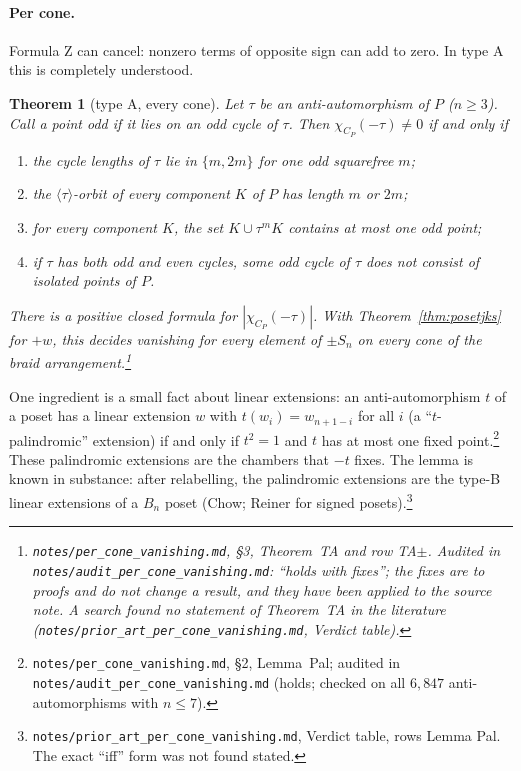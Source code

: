 \documentclass[11pt]{article}
\newtheorem{theorem}{Theorem}
\theoremstyle{definition}
\theoremstyle{remark}
\newcommand{\src}[1]{\nolinkurl{#1}}
\newcommand{\tagbox}[1]{\leavevmode\marginpar{\raggedright\fbox{\parbox{0.66in}{\centering\scriptsize\sffamily #1}}}}
\newcommand{\PROVEN}{\tagbox{PROVEN\\AUDITED}}
\begin{document}
\paragraph{Per cone.} Formula Z can cancel: nonzero terms of opposite sign can
add to zero. In type A this is completely understood.

\begin{theorem}[type A, every cone]\label{thm:TA}\PROVEN
Let $\tau$ be an anti-automorphism of $P$ ($n\ge3$). Call a point odd if it lies on an odd cycle of $\tau$. Then
$\chi_{C_P}(-\tau)\ne0$ if and only if
\begin{enumerate}
\item[(1)] the cycle lengths of $\tau$ lie in $\{m,2m\}$ for one odd
  squarefree $m$;
\item[(2)] the $\langle\tau\rangle$-orbit of every component $K$ of $P$ has
  length $m$ or $2m$;
\item[(3)] for every component $K$, the set $K\cup\tau^mK$ contains at most
  one odd point;
\item[(4)] if $\tau$ has both odd and even cycles, some odd cycle of $\tau$
  does not consist of isolated points of $P$.
\end{enumerate}
There is a positive closed formula for $|\chi_{C_P}(-\tau)|$. With Theorem~\ref{thm:posetjks} for $+w$,
this decides vanishing for every element of $\pm S_n$ on every cone of the
braid arrangement.\footnote{\src{notes/per_cone_vanishing.md}, \S3, Theorem~TA
and row TA$\pm$. Audited in \src{notes/audit_per_cone_vanishing.md}:
``holds with fixes''; the fixes are to proofs and do not change a result,
and they have been applied to the source note. A search found no statement
of Theorem~TA in the literature
(\src{notes/prior_art_per_cone_vanishing.md}, Verdict table).}
\end{theorem}

One ingredient is a small fact about linear extensions: an anti-automorphism
$t$ of a poset has a linear extension $w$ with $t(w_i)=w_{n+1-i}$ for all $i$
(a ``$t$-palindromic'' extension) if and only if $t^2=1$ and $t$ has at most
one fixed point.\footnote{\src{notes/per_cone_vanishing.md}, \S2, Lemma~Pal;
audited in \src{notes/audit_per_cone_vanishing.md} (holds; checked on all
$6{,}847$ anti-automorphisms with $n\le7$).}\PROVEN{} These palindromic
extensions are the chambers that $-t$ fixes. The lemma is known in
substance: after relabelling, the palindromic extensions are the type-B
linear extensions of a $B_n$ poset (Chow; Reiner for signed
posets).\footnote{\src{notes/prior_art_per_cone_vanishing.md}, Verdict
table, rows Lemma Pal. The exact ``iff'' form was not found stated.}
\end{document}
